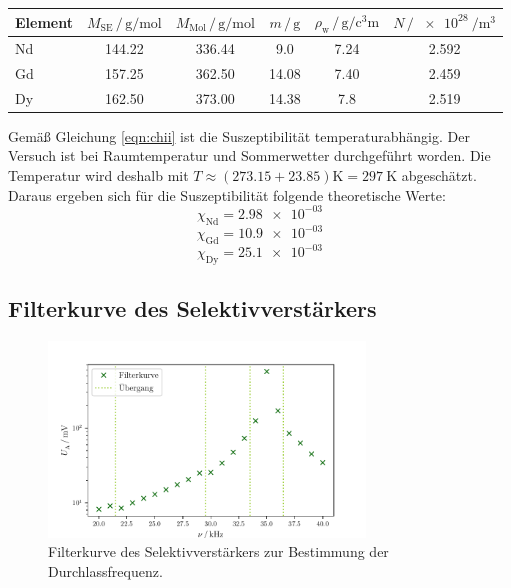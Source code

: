     \begin{table}
        \centering
        \caption{}
        \label{tab:Theo2}
        \begin{tabular}{l c c S[table-format=2.2] S[table-format=1.2] c}
            \toprule
            Element & 
            $M_\text{SE}\,/\,\si{\gram\per\mole}$ &
            $M_\text{Mol}\,/\,\si{\gram\per\mole}$ &
            $m\,/\,\si{\gram}$ & 
            $\rho_\text{w}\,/\,\si{\gram\per\cubic\centi\meter}$ &
            $N\,/\,\SI{e28}{\per\cubic\meter}$ \\
            \midrule
            Nd & 144.22 & 336.44 & 9.0   & 7.24 & 2.592 \\
            Gd & 157.25 & 362.50 & 14.08 & 7.40 & 2.459 \\
            Dy & 162.50 & 373.00 & 14.38 & 7.8  & 2.519 \\
            \bottomrule
        \end{tabular}
    \end{table}

    Gemäß Gleichung \eqref{eqn:chii} ist die Suszeptibilität temperaturabhängig. 
    Der Versuch ist bei Raumtemperatur und Sommerwetter durchgeführt worden. 
    Die Temperatur wird deshalb mit ${T\approx(\num{273.15}+\num{23.85})\si{\kelvin}=\SI{297}{\kelvin}}$ abgeschätzt.
    Daraus ergeben sich für die Suszeptibilität folgende theoretische Werte:
    \begin{equation}
        \chi _\text{Nd}=\num{2.98e-03} 
        \label{eqn:chi1}
    \end{equation}
    \begin{equation}
        \chi _\text{Gd}=\num{10.9e-03} 
    \end{equation}
    \begin{equation}
        \chi _\text{Dy}=\num{25.1e-03} 
        \label{eqn:chi3}
    \end{equation}
        
        


\subsection{Filterkurve des Selektivverstärkers}

    \begin{figure}
        \centering
        \includegraphics[width=0.75\textwidth]{plots/Filterkurve.pdf}
        \caption{Filterkurve des Selektivverstärkers zur Bestimmung der Durchlassfrequenz.}
        \label{fig:Filterkurve}
    \end{figure}

